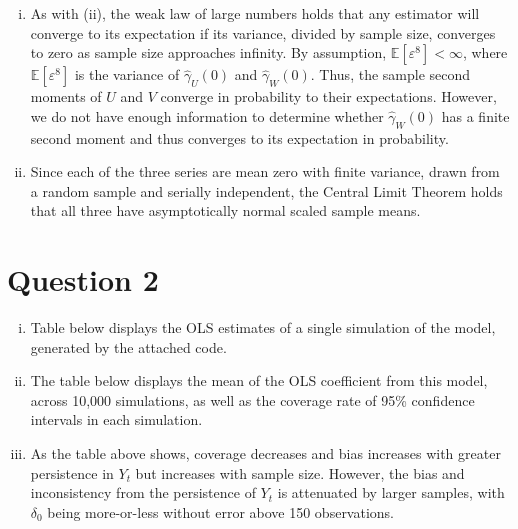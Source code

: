 \documentclass{article}
\newcommand{\eps}{\varepsilon}
\newcommand{\E}[1]{\mathbb{E}\left[#1\right]}%
\begin{document}
\begin{enumerate}[(i)]
	\item As with (ii), the weak law of large numbers holds that any estimator will converge to its expectation if its variance, divided by sample size, converges to zero as sample size approaches infinity. By assumption, ${\E{\eps^8}<\infty}$, where $\E{\eps^8}$ is the variance of $\hat{\gamma}_U(0)$ and $\hat{\gamma}_W(0)$. Thus, the sample second moments of $U$ and $V$ converge in probability to their expectations. However, we do not have enough information to determine whether $\hat{\gamma}_W(0)$ has a finite second moment and thus converges to its expectation in probability.
	
	\item Since each of the three series are mean zero with finite variance, drawn from a random sample and serially independent, the Central Limit Theorem holds that all three have asymptotically normal scaled sample means.
	
\end{enumerate}


\pagebreak
\section*{Question 2}

\begin{enumerate}[(i)]
	\item Table below displays the OLS estimates of a single simulation of the model, generated by the attached code.
		\begin{center}
			
		\end{center}
	\pagebreak
	\item The table below displays the mean of the OLS coefficient from this model, across 10,000 simulations, as well as the coverage rate of 95\% confidence intervals in each simulation.
		\begin{center}
			
		\end{center}
	
	\item As the table above shows, coverage decreases and bias increases with greater persistence in $Y_t$ but increases with sample size. However, the bias and inconsistency from the persistence of $Y_t$ is attenuated by larger samples, with $\delta_0$ being more-or-less without error above 150 observations.
	
\end{enumerate}




\end{document}

